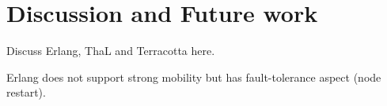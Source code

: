 \section{Discussion and Future work}

Discuss Erlang, ThaL and Terracotta here.

Erlang does not support strong mobility but has fault-tolerance aspect (node restart).

